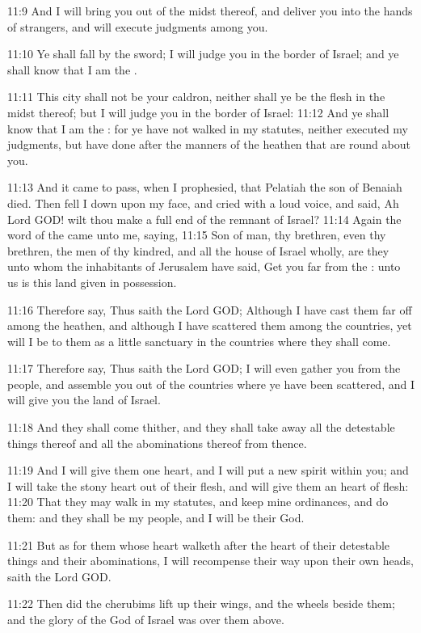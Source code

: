 11:9 And I will bring you out of the midst thereof, and deliver you
into the hands of strangers, and will execute judgments among you.

11:10 Ye shall fall by the sword; I will judge you in the border of
Israel; and ye shall know that I am the \LORD.

11:11 This city shall not be your caldron, neither shall ye be the
flesh in the midst thereof; but I will judge you in the border of
Israel: 11:12 And ye shall know that I am the \LORD: for ye have not
walked in my statutes, neither executed my judgments, but have done
after the manners of the heathen that are round about you.

11:13 And it came to pass, when I prophesied, that Pelatiah the son of
Benaiah died. Then fell I down upon my face, and cried with a loud
voice, and said, Ah Lord GOD! wilt thou make a full end of the remnant
of Israel?  11:14 Again the word of the \LORD came unto me, saying,
11:15 Son of man, thy brethren, even thy brethren, the men of thy
kindred, and all the house of Israel wholly, are they unto whom the
inhabitants of Jerusalem have said, Get you far from the \LORD: unto us
is this land given in possession.

11:16 Therefore say, Thus saith the Lord GOD; Although I have cast
them far off among the heathen, and although I have scattered them
among the countries, yet will I be to them as a little sanctuary in
the countries where they shall come.

11:17 Therefore say, Thus saith the Lord GOD; I will even gather you
from the people, and assemble you out of the countries where ye have
been scattered, and I will give you the land of Israel.

11:18 And they shall come thither, and they shall take away all the
detestable things thereof and all the abominations thereof from
thence.

11:19 And I will give them one heart, and I will put a new spirit
within you; and I will take the stony heart out of their flesh, and
will give them an heart of flesh: 11:20 That they may walk in my
statutes, and keep mine ordinances, and do them: and they shall be my
people, and I will be their God.

11:21 But as for them whose heart walketh after the heart of their
detestable things and their abominations, I will recompense their way
upon their own heads, saith the Lord GOD.

11:22 Then did the cherubims lift up their wings, and the wheels
beside them; and the glory of the God of Israel was over them above.

